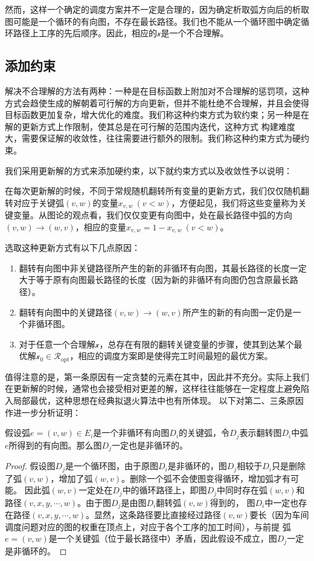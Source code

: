 然而，这样一个确定的调度方案并不一定是合理的，因为确定析取弧方向后的析取图可能是一个循环的有向图，不存在最长路径。我们也不能从一个循环图中确定循环路径上工序的先后顺序。因此，相应的$\mathcal{x}$是一个不合理解。

\subsection{添加约束}
解决不合理解的方法有两种：一种是在目标函数上附加对不合理解的惩罚项，这种方式会趋使生成的解朝着可行解的方向更新，但并不能杜绝不合理解，并且会使得目标函数更加复杂，增大优化的难度。我们称这种约束方式为软约束；另一种是在解的更新方式上作限制，使其总是在可行解的范围内迭代，这种方式
构建难度大，需要保证解的收敛性，往往需要进行额外的限制。我们称这种约束方式为硬约束。

我们采用\citet{van1992job}更新解的方式来添加硬约束，以下就约束方式以及收敛性予以说明：

在每次更新解的时候，不同于常规随机翻转所有变量的更新方式，我们仅仅随机翻转对应于关键弧$(v,w)$的变量$x_{v,w}~(v<w)$，方便起见，我们将这些变量称为关键变量。从图论的观点看，我们仅仅变更有向图中，处在最长路径中弧的方向$(v,w)\rightarrow(w,v)$，相应的变量$x_{v,w} = 1 - x_{v,w}~(v<w)$。

选取这种更新方式有以下几点原因：
\begin{enumerate}
    \item 翻转有向图中非关键路径所产生的新的非循环有向图，其最长路径的长度一定大于等于原有向图最长路径的长度（因为新的非循环有向图仍包含原最长路径）。
    \item 翻转有向图中的关键路径$(v,w)\rightarrow(w,v)$所产生的新的有向图一定仍是一个非循环图。
    \item 对于任意一个合理解$\mathcal{x}$，总存在有限的翻转关键变量的步骤，使其到达某个最优解$\mathcal{x}_{0} \in \mathscr{R}_\text{opt}$，相应的调度方案即是使得完工时间最短的最优方案。
\end{enumerate}

值得注意的是，第一条原因有一定贪婪的元素在其中，因此并不充分。实际上我们在更新解的时候，通常也会接受相对更差的解，这样往往能够在一定程度上避免陷入局部最优，这种思想在经典拟退火算法中也有所体现。
以下对第二、三条原因作进一步分析证明：
\begin{assertion} \label{assert:update_no_cycle}
    假设弧$e=(v,w)\in E_i$是一个非循环有向图$D_i$的关键弧，令$D_j$表示翻转图$D_i$中弧$e$所得到的有向图。那么图$D_j$一定也是非循环的。
\end{assertion}

\begin{proof}
    假设图$D_j$是一个循环图，由于原图$D_i$是非循环的，图$D_j$相较于$D_i$只是删除了弧$(v,w)$，增加了弧$(w,v)$。删除一个弧不会使图变得循环，增加弧才有可能。
    因此弧$(w,v)$一定处在$D_j$中的循环路径上，即图$D_j$中同时存在弧$(w,v)$和路径$(v,x,y,\cdots,w)$。由于图$D_j$是由图$D_i$翻转弧$(v,w)$得到的，
    图$D_i$中一定也存在路径$(v,x,y,\cdots,w)$。显然，这条路径要比直接经过路径$(v,w)$要长（因为车间调度问题对应的图的权重在顶点上，对应于各个工序的加工时间），与前提
    弧$e=(v,w)$是一个关键弧（位于最长路径中）矛盾，因此假设不成立，图$D_j$一定是非循环的。
\end{proof}

